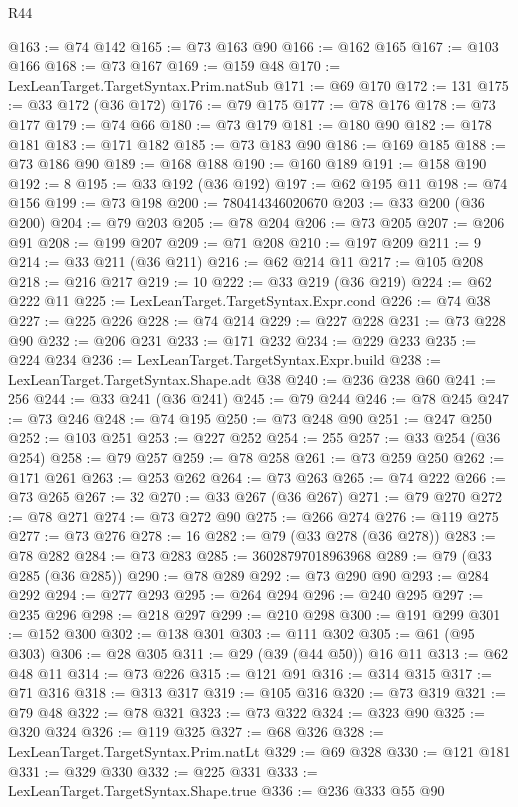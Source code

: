 \begin{lexlean}{R44}
\begin{coremodule}
@163 := @74 @142
@165 := @73 @163 @90
@166 := @162 @165
@167 := @103 @166
@168 := @73 @167
@169 := @159 @48
@170 := LexLeanTarget.TargetSyntax.Prim.natSub
@171 := @69 @170
@172 := 131
@175 := @33 @172 (@36 @172)
@176 := @79 @175
@177 := @78 @176
@178 := @73 @177
@179 := @74 @66
@180 := @73 @179
@181 := @180 @90
@182 := @178 @181
@183 := @171 @182
@185 := @73 @183 @90
@186 := @169 @185
@188 := @73 @186 @90
@189 := @168 @188
@190 := @160 @189
@191 := @158 @190
@192 := 8
@195 := @33 @192 (@36 @192)
@197 := @62 @195 @11
@198 := @74 @156
@199 := @73 @198
@200 := 780414346020670
@203 := @33 @200 (@36 @200)
@204 := @79 @203
@205 := @78 @204
@206 := @73 @205
@207 := @206 @91
@208 := @199 @207
@209 := @71 @208
@210 := @197 @209
@211 := 9
@214 := @33 @211 (@36 @211)
@216 := @62 @214 @11
@217 := @105 @208
@218 := @216 @217
@219 := 10
@222 := @33 @219 (@36 @219)
@224 := @62 @222 @11
@225 := LexLeanTarget.TargetSyntax.Expr.cond
@226 := @74 @38
@227 := @225 @226
@228 := @74 @214
@229 := @227 @228
@231 := @73 @228 @90
@232 := @206 @231
@233 := @171 @232
@234 := @229 @233
@235 := @224 @234
@236 := LexLeanTarget.TargetSyntax.Expr.build
@238 := LexLeanTarget.TargetSyntax.Shape.adt @38
@240 := @236 @238 @60
@241 := 256
@244 := @33 @241 (@36 @241)
@245 := @79 @244
@246 := @78 @245
@247 := @73 @246
@248 := @74 @195
@250 := @73 @248 @90
@251 := @247 @250
@252 := @103 @251
@253 := @227 @252
@254 := 255
@257 := @33 @254 (@36 @254)
@258 := @79 @257
@259 := @78 @258
@261 := @73 @259 @250
@262 := @171 @261
@263 := @253 @262
@264 := @73 @263
@265 := @74 @222
@266 := @73 @265
@267 := 32
@270 := @33 @267 (@36 @267)
@271 := @79 @270
@272 := @78 @271
@274 := @73 @272 @90
@275 := @266 @274
@276 := @119 @275
@277 := @73 @276
@278 := 16
@282 := @79 (@33 @278 (@36 @278))
@283 := @78 @282
@284 := @73 @283
@285 := 36028797018963968
@289 := @79 (@33 @285 (@36 @285))
@290 := @78 @289
@292 := @73 @290 @90
@293 := @284 @292
@294 := @277 @293
@295 := @264 @294
@296 := @240 @295
@297 := @235 @296
@298 := @218 @297
@299 := @210 @298
@300 := @191 @299
@301 := @152 @300
@302 := @138 @301
@303 := @111 @302
@305 := @61 (@95 @303)
@306 := @28 @305
@311 := @29 (@39 (@44 @50)) @16 @11
@313 := @62 @48 @11
@314 := @73 @226
@315 := @121 @91
@316 := @314 @315
@317 := @71 @316
@318 := @313 @317
@319 := @105 @316
@320 := @73 @319
@321 := @79 @48
@322 := @78 @321
@323 := @73 @322
@324 := @323 @90
@325 := @320 @324
@326 := @119 @325
@327 := @68 @326
@328 := LexLeanTarget.TargetSyntax.Prim.natLt
@329 := @69 @328
@330 := @121 @181
@331 := @329 @330
@332 := @225 @331
@333 := LexLeanTarget.TargetSyntax.Shape.true
@336 := @236 @333 @55 @90

\end{coremodule}
\end{lexlean}
